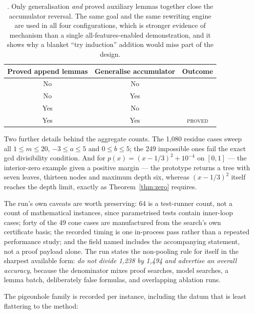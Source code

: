 \begin{table}[htbp]
\centering\small
\begin{tabular}{@{}ccc@{}}
\toprule
Proved append lemmas & Generalise accumulator & Outcome \\
\midrule
No  & No  & \unknown{} \\
No  & Yes & \unknown{} \\
Yes & No  & \unknown{} \\
Yes & Yes & \textsc{proved} \\
\bottomrule
\end{tabular}
\caption{. Only generalisation \emph{and} proved auxiliary lemmas
together close the accumulator reversal. The same goal and the same rewriting
engine are used in all four configurations, which is stronger evidence of
mechanism than a single all-features-enabled demonstration, and it shows why a
blanket ``try induction'' addition would miss part of the design.}
\label{tab:p4-ablation}
\end{table}

Two further details behind the aggregate counts. The 1{,}080 residue cases sweep
all $1\le m\le20$, $-3\le a\le5$ and $0\le b\le5$; the 249 impossible ones fail
the exact gcd divisibility condition. And for
$p(x)=(x-1/3)^2+10^{-4}$ on $[0,1]$ --- the interior-zero example given a
positive margin --- the prototype returns a tree with seven leaves, thirteen
nodes and maximum depth six, whereas $(x-1/3)^2$ itself reaches the depth limit,
exactly as Theorem~\ref{thm:zero} requires.

The run's own caveats are worth preserving: 64 is a test-runner count, not a
count of mathematical instances, since parametrised tests contain inner-loop
cases; forty of the 49 cone cases are manufactured from the search's own
certificate basis; the recorded timing is one in-process pass rather than a
repeated performance study; and the field named 
includes the accompanying statement, not a proof payload alone. The run states
the non-pooling rule for itself in the sharpest available form: \emph{do not
divide 1{,}238 by 1{,}494 and advertise an overall accuracy}, because the
denominator mixes proof searches, model searches, a lemma batch, deliberately
false formulas, and overlapping ablation runs.

The pigeonhole family is recorded per instance, including the datum that is
least flattering to the method:

